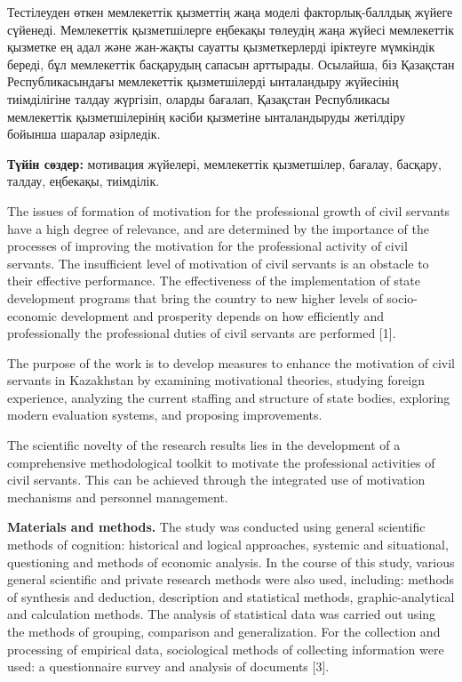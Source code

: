 Тестілеуден өткен мемлекеттік қызметтің жаңа моделі факторлық-баллдық
жүйеге сүйенеді. Мемлекеттік қызметшілерге еңбекақы төлеудің жаңа жүйесі
мемлекеттік қызметке ең адал және жан-жақты сауатты қызметкерлерді
іріктеуге мүмкіндік береді, бұл мемлекеттік басқарудың сапасын
арттырады. Осылайша, біз Қазақстан Республикасындағы мемлекеттік
қызметшілерді ынталандыру жүйесінің тиімділігіне талдау жүргізіп, оларды
бағалап, Қазақстан Республикасы мемлекеттік қызметшілерінің кәсіби
қызметіне ынталандыруды жетілдіру бойынша шаралар әзірледік.

{\bfseries Түйін сөздер:} мотивация жүйелері, мемлекеттік қызметшілер,
бағалау, басқару, талдау, еңбекақы, тиімділік.

\begin{multicols}{2}
The issues of formation of motivation for the professional growth of
civil servants have a high degree of relevance, and are determined by
the importance of the processes of improving the motivation for the
professional activity of civil servants. The insufficient level of
motivation of civil servants is an obstacle to their effective
performance. The effectiveness of the implementation of state
development programs that bring the country to new higher levels of
socio-economic development and prosperity depends on how efficiently and
professionally the professional duties of civil servants are performed
{[}1{]}.

The purpose of the work is to develop measures to enhance the motivation
of civil servants in Kazakhstan by examining motivational theories,
studying foreign experience, analyzing the current staffing and
structure of state bodies, exploring modern evaluation systems, and
proposing improvements.

The scientific novelty of the research results lies in the development
of a comprehensive methodological toolkit to motivate the professional
activities of civil servants. This can be achieved through the
integrated use of motivation mechanisms and personnel management.

{\bfseries Materials and methods.} The study was conducted using general
scientific methods of cognition: historical and logical approaches,
systemic and situational, questioning and methods of economic analysis.
In the course of this study, various general scientific and private
research methods were also used, including: methods of synthesis and
deduction, description and statistical methods, graphic-analytical and
calculation methods. The analysis of statistical data was carried out
using the methods of grouping, comparison and generalization. For the
collection and processing of empirical data, sociological methods of
collecting information were used: a questionnaire survey and analysis of
documents {[}3{]}.


\end{multicols}
